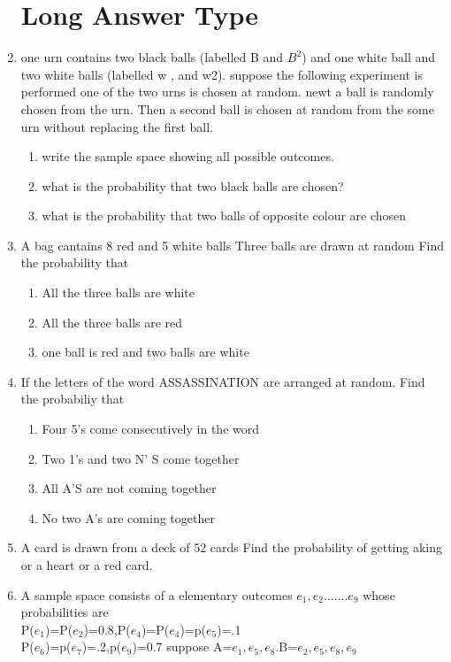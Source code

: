 \documentclass[12pt]{article}
\begin{document}
\begin{enumerate}
\section*{Long Answer Type}
\item one urn contains two black balls (labelled B and $B^2$) and one white ball and two white balls (labelled w , and w2). suppose the  following experiment is performed one of the two urns is chosen at random. newt a ball is randomly chosen from the urn. Then a second ball is chosen at random from the some urn without replacing the first ball.
	\begin{enumerate}
\item write the sample space showing all possible outcomes.
\item what is the probability that two black balls are chosen?
\item what is the probability that two balls of opposite colour are chosen
	\end{enumerate}
\item A bag cantains 8 red and 5 white balls Three balls are drawn at random Find the probability that 
\begin{enumerate}
\item All the three balls are white
\item All the three balls are red
\item one ball is red and two balls are white
	\end{enumerate}
\item If the letters of the word ASSASSINATION are arranged at  random. Find the probabiliy that
\begin{enumerate}
\item Four 5's come consecutively in the word
\item Two 1's and two N' S  come together
\item All A'S are not coming together
\item No two A's are coming together
	\end{enumerate}
\item A card is drawn from a deck of 52 cards Find the probability of getting aking or a heart or a red card.
\item A sample space consists of a elementary outcomes $e_1,e_2.......e_9$ whose probabilities are
\\P($e_1$)=P($e_2$)=0.8,P($e_4$)=P($e_4$)=p($e_5$)=.1
\\ P($e_6$)=p($e_7$)=.2,p($e_9$)=0.7
suppose A={$e_1,e_5,e_8$}.B={$e_2,e_5,e_8,e_9$}
\begin{enumerate} 

\end{enumerate}
\end{enumerate}
\end{document}
